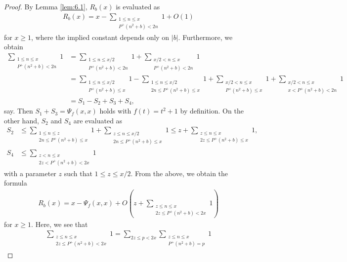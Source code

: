 \documentclass[a4paper,11pt]{amsart}
\theoremstyle{definition}
\numberwithin{equation}{section}
\begin{document}
\begin{proof}
By Lemma \ref{lem:6.1}, $R_b(x)$ is evaluated as
\begin{align*}
R_b(x)
= x - \sum_{\substack{1 \leq n \leq x \\ P^+(n^2+b)<2n}} 1 +O(1)
\end{align*}
for $x \geq1$, where the implied constant depends only on $|b|$. 
Furthermore, we obtain
\begin{align*}
\sum_{\substack{1 \leq n \leq x \\ P^+(n^2+b)<2n}} 1
&= \sum_{\substack{1 \leq n \leq x/2 \\ P^+(n^2+b)<2n}} 1
+ \sum_{\substack{x/2< n \leq x \\ P^+(n^2+b)<2n}} 1 \\ 
&= \sum_{\substack{1 \leq n \leq x/2 \\ P^+(n^2+b) \leq x}} 1
- \sum_{\substack{1 \leq n \leq x/2 \\ 2n \leq P^+(n^2+b) \leq x}} 1
+ \sum_{\substack{x/2< n \leq x \\ P^+(n^2+b) \leq x}} 1 
+ \sum_{\substack{x/2< n \leq x \\ x<P^+(n^2+b)<2n}} 1 \\
&= S_1-S_2+S_3+S_4, 
\end{align*}
say. 
Then $S_1+S_3=\Psi_f(x,x)$ holds with $f(t)=t^2+1$ by definition. 
On the other hand, $S_2$ and $S_4$ are evaluated as
\begin{align*}
S_2
&\leq \sum_{\substack{1 \leq n \leq z \\ 2n \leq P^+(n^2+b) \leq x}} 1
+ \sum_{\substack{z \leq n \leq x/2 \\ 2n \leq P^+(n^2+b) \leq x}} 1
\leq z + \sum_{\substack{z \leq n \leq x \\ 2z \leq P^+(n^2+b) \leq x}} 1, \\
S_4
&\leq \sum_{\substack{z< n \leq x \\ 2z<P^+(n^2+b)<2x}} 1
\end{align*}
with a parameter $z$ such that $1\leq z \leq x/2$. 
From the above, we obtain the formula
\begin{align}\label{eq:10111726}
R_b(x)
= x - \Psi_f(x,x) 
+ O\left(z+\sum_{\substack{z \leq n \leq x \\ 2z \leq P^+(n^2+b)<2x}} 1\right)
\end{align}
for $x \geq1$. 
Here, we see that
\begin{align*}
\sum_{\substack{z \leq n \leq x \\ 2z \leq P^+(n^2+b)<2x}} 1
= \sum_{2z \leq p < 2x} \sum_{\substack{z \leq n \leq x \\ P^+(n^2+b)=p}} 1

\end{align*}
\end{proof}
\end{document}
